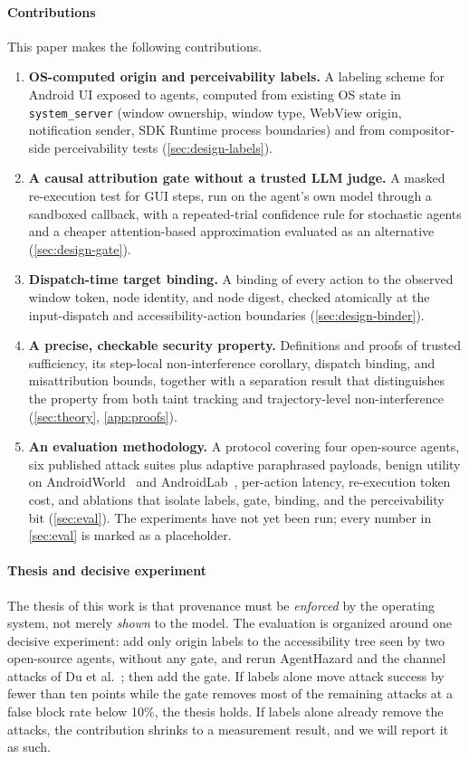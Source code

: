 \paragraph{Contributions}
This paper makes the following contributions.
\begin{enumerate}[label=\textbf{C\arabic*.}, leftmargin=*]
  \item \textbf{OS-computed origin and perceivability labels.} A labeling scheme for Android UI exposed to agents, computed from existing OS state in \texttt{system\_server} (window ownership, window type, WebView origin, notification sender, SDK Runtime process boundaries) and from compositor-side perceivability tests (\cref{sec:design-labels}).
  \item \textbf{A causal attribution gate without a trusted LLM judge.} A masked re-execution test for GUI steps, run on the agent's own model through a sandboxed callback, with a repeated-trial confidence rule for stochastic agents and a cheaper attention-based approximation evaluated as an alternative (\cref{sec:design-gate}).
  \item \textbf{Dispatch-time target binding.} A binding of every action to the observed window token, node identity, and node digest, checked atomically at the input-dispatch and accessibility-action boundaries (\cref{sec:design-binder}).
  \item \textbf{A precise, checkable security property.} Definitions and proofs of trusted sufficiency, its step-local non-interference corollary, dispatch binding, and misattribution bounds, together with a separation result that distinguishes the property from both taint tracking and trajectory-level non-interference (\cref{sec:theory}, \cref{app:proofs}).
  \item \textbf{An evaluation methodology.} A protocol covering four open-source agents, six published attack suites plus adaptive paraphrased payloads, benign utility on AndroidWorld~\cite{rawles2025androidworld} and AndroidLab~\cite{xu2025androidlab}, per-action latency, re-execution token cost, and ablations that isolate labels, gate, binding, and the perceivability bit (\cref{sec:eval}). The experiments have not yet been run; every number in \cref{sec:eval} is marked as a placeholder.
\end{enumerate}

\paragraph{Thesis and decisive experiment}
The thesis of this work is that provenance must be \emph{enforced} by the operating system, not merely \emph{shown} to the model. The evaluation is organized around one decisive experiment: add only origin labels to the accessibility tree seen by two open-source agents, without any gate, and rerun AgentHazard and the channel attacks of Du et al.~\cite{du2025measuringmobileagents}; then add the gate. If labels alone move attack success by fewer than ten points while the gate removes most of the remaining attacks at a false block rate below 10\%, the thesis holds. If labels alone already remove the attacks, the contribution shrinks to a measurement result, and we will report it as such.

